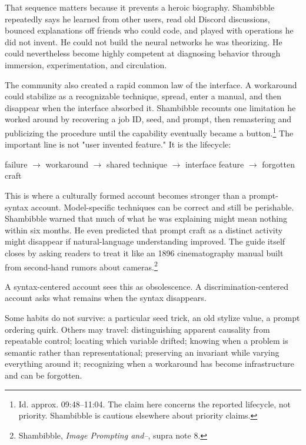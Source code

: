 \documentclass[11pt]{article}
\begin{document}
That sequence matters because it prevents a heroic biography. Shambibble repeatedly says he learned from other users, read old Discord discussions, bounced explanations off friends who could code, and played with operations he did not invent. He could not build the neural networks he was theorizing. He could nevertheless become highly competent at diagnosing behavior through immersion, experimentation, and circulation.

The community also created a rapid common law of the interface. A workaround could stabilize as a recognizable technique, spread, enter a manual, and then disappear when the interface absorbed it. Shambibble recounts one limitation he worked around by recovering a job ID, seed, and prompt, then remastering and publicizing the procedure until the capability eventually became a button.\footnote{Id. approx. 09:48--11:04. The claim here concerns the reported lifecycle, not priority. Shambibble is cautious elsewhere about priority claims.} The important line is not "user invented feature." It is the lifecycle:

\begin{center}
failure $\rightarrow$ workaround $\rightarrow$ shared technique $\rightarrow$ interface feature $\rightarrow$ forgotten craft
\end{center}

This is where a culturally formed account becomes stronger than a prompt-syntax account. Model-specific techniques can be correct and still be perishable. Shambibble warned that much of what he was explaining might mean nothing within six months. He even predicted that prompt craft as a distinct activity might disappear if natural-language understanding improved. The guide itself closes by asking readers to treat it like an 1896 cinematography manual built from second-hand rumors about cameras.\footnote{Shambibble, \textit{Image Prompting and--}, supra note 8.}

A syntax-centered account sees this as obsolescence. A discrimination-centered account asks what remains when the syntax disappears.

Some habits do not survive: a particular seed trick, an old stylize value, a prompt ordering quirk. Others may travel: distinguishing apparent causality from repeatable control; locating which variable drifted; knowing when a problem is semantic rather than representational; preserving an invariant while varying everything around it; recognizing when a workaround has become infrastructure and can be forgotten.
\end{document}
